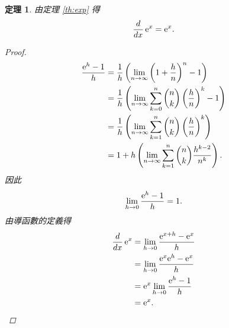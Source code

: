 \documentclass[a4paper]{article}
\newcommand  {\e}{\textup e}
\theoremstyle{plain}
\newtheorem{theorem}{定理}
\theoremstyle{definition}
\theoremstyle{remark}
\begin{document}
\begin{CJK}{UTF8}{bsmi}
\begin{theorem}
  由定理 \ref{th:exp} 得
  \[\frac{d}{dx}\,\e^x = \e^x.\]
  \begin{proof}
    \begin{align*}
      \frac{\e^h - 1}{h} &= \frac1h \left( \lim_{n \to \infty} \left( 1 + \frac h n \right)^n - 1 \right)\\
	&= \frac1h \left( \lim_{n \to \infty} \sum_{k=0}^n \binom n k \left( \frac h n \right)^k - 1 \right)\\
	&= \frac1h \left( \lim_{n \to \infty} \sum_{k=1}^n \binom n k \left( \frac h n \right)^k \right)\\
	&= 1 + h \left( \lim_{n \to \infty} \sum_{k=1}^n \binom n k \frac{h^{k-2}}{n^k} \right).
    \end{align*}
    因此
    \[\lim_{h \to 0} \frac{\e^h - 1}{h} = 1.\]
    由導函數的定義得
    \begin{align*}
      \frac{d}{dx}\,\e^x &= \lim_{h \to 0} \frac{\e^{x+h} - \e^x}{h}\\
	&= \lim_{h \to 0} \frac{\e^x \e^h - \e^x}{h}\\
	&= \e^x \lim_{h \to 0} \frac{\e^h - 1}{h}\\
	&= \e^x. \qedhere
    \end{align*}
  \end{proof}
\end{theorem}

\clearpage
\end{CJK}
\end{document}
